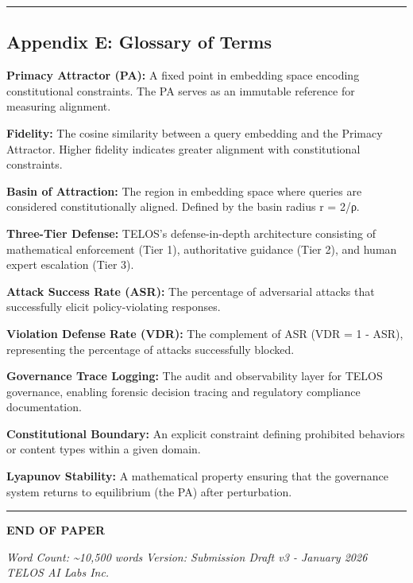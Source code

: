 \begin{center}\rule{0.5\linewidth}{0.5pt}\end{center}

\subsection{Appendix E: Glossary of
Terms}\label{appendix-e-glossary-of-terms}

\textbf{Primacy Attractor (PA):} A fixed point in embedding space
encoding constitutional constraints. The PA serves as an immutable
reference for measuring alignment.

\textbf{Fidelity:} The cosine similarity between a query embedding and
the Primacy Attractor. Higher fidelity indicates greater alignment with
constitutional constraints.

\textbf{Basin of Attraction:} The region in embedding space where
queries are considered constitutionally aligned. Defined by the basin
radius r = 2/ρ.

\textbf{Three-Tier Defense:} TELOS's defense-in-depth architecture
consisting of mathematical enforcement (Tier 1), authoritative guidance
(Tier 2), and human expert escalation (Tier 3).

\textbf{Attack Success Rate (ASR):} The percentage of adversarial
attacks that successfully elicit policy-violating responses.

\textbf{Violation Defense Rate (VDR):} The complement of ASR (VDR = 1 -
ASR), representing the percentage of attacks successfully blocked.

\textbf{Governance Trace Logging:} The audit and observability layer for
TELOS governance, enabling forensic decision tracing and regulatory
compliance documentation.

\textbf{Constitutional Boundary:} An explicit constraint defining
prohibited behaviors or content types within a given domain.

\textbf{Lyapunov Stability:} A mathematical property ensuring that the
governance system returns to equilibrium (the PA) after perturbation.

\begin{center}\rule{0.5\linewidth}{0.5pt}\end{center}

\textbf{END OF PAPER}

\emph{Word Count: \textasciitilde10,500 words} \emph{Version: Submission
Draft v3 - January 2026} \emph{TELOS AI Labs Inc.}
